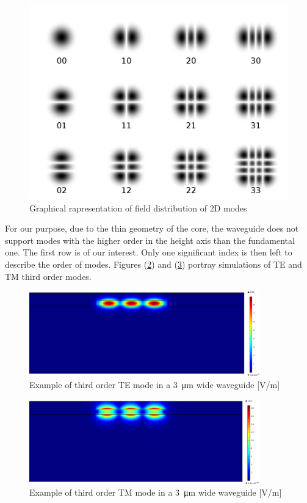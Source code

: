 \documentclass[12pt,a4paper,twoside]{article}
\begin{document}
\begin{figure}[!ht]
	\centering
	\includegraphics[width=.4\textwidth]{2Dmodes.png}
	\caption{Graphical rapresentation of field distribution of 2D modes}
	\label{fig_2dmodes}
\end{figure}

For our purpose, due to the thin geometry of the core, the waveguide does not support modes with the higher order in the height axis than the fundamental one.
The first row is of our interest.
Only one significant index is then left to describe the order of modes.
Figures (\ref{fig_ex_mode_TE}) and (\ref{fig_ex_mode_TM}) portray simulations of TE and TM third order modes.
\begin{figure}[!hb]
	\centering
	\includegraphics[width=0.89\textwidth]{output_modeTE.pdf}
	\caption{Example of third order TE mode in a \SI{3}{\um} wide waveguide [V/m]}
	\label{fig_ex_mode_TE}
\end{figure}
\begin{figure}[!h]
	\centering
	\includegraphics[width=0.89\textwidth]{output_modeTM.pdf}
	\caption{Example of third order TM mode in a \SI{3}{\um} wide waveguide [V/m]}
	\label{fig_ex_mode_TM}
\end{figure}
\end{document}
